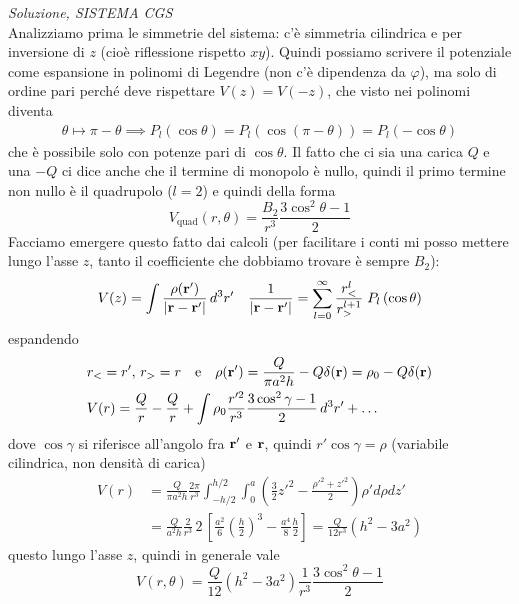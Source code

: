 \textit{Soluzione, SISTEMA CGS}\\
Analizziamo prima le simmetrie del sistema: c'è simmetria cilindrica e per inversione di $ z $ (cioè riflessione rispetto $ xy $). Quindi possiamo 
scrivere il potenziale come espansione in polinomi di Legendre (non c'è dipendenza da $ \varphi $), ma solo di ordine pari perché deve rispettare 
$ V(z) = V(-z) $, che visto nei polinomi diventa
\begin{align}
  \theta \mapsto \pi - \theta \implies P_l(\cos\theta) = P_l(\cos(\pi-\theta)) = P_l (-\cos\theta) 
\end{align}
che è possibile solo con potenze pari di $ \cos\theta $. Il fatto che ci sia una carica $ Q $ e una $ -Q $ ci dice anche che il termine di monopolo è 
nullo, quindi il primo termine non nullo è il quadrupolo ($ l=2 $) e quindi della forma
\begin{equation}
  V_{\text{quad}}(r, \theta) = \frac{B_2}{r^3} \frac{3\cos^2\theta - 1}{2}
\end{equation}
Facciamo emergere questo fatto dai calcoli (per facilitare i conti mi posso mettere lungo l'asse $ z $, tanto il coefficiente che dobbiamo trovare è
sempre $ B_2 $):
\begin{align}
  V(z) = \int \frac{\rho(\mathbf{ r }')}{\mathbf{ |r-r'| } } \,d^3r' && \frac{1}{\mathbf{ |r-r'| }} = \sum_{l=0}^{\infty} \frac{r_{<}^{l}}{r_{>}^{l+1}} \; P_l \left( \cos \theta \right)
\end{align}
espandendo
\begin{align}
  &r_< = r' , \, r_> = r \quad \text{e} \quad \rho(\mathbf{ r' }) = \frac{Q}{\pi a^2 h} -Q \delta (\mathbf{ r }) = \rho_0 - Q \delta(\mathbf{ r })
  \\
  &V(r) = \frac{Q}{r} - \frac{Q}{r} + \int \rho_0 \frac{r'^2}{r^3} \frac{3\cos^2\gamma - 1}{2} \,d^3r' + \dots
\end{align}
dove $ \cos\gamma $ si riferisce all'angolo fra $ \mathbf{ r }' $ e $ \mathbf{ r } $, quindi $ r' \cos \gamma = \rho $ (variabile cilindrica, non densità 
di carica)
\begin{align}
  V(r) &= \frac{Q}{\pi a^2 h} \frac{2\pi}{r^3} \int_{-h/2}^{h/2} \int_{0}^{a}  \left( \frac{3}{2} z'^2 - \frac{\rho'^2 + z'^2}{2} \right) \rho' d\rho dz'
  \\
  &= \frac{Q}{a^2 h} \frac{2}{r^3}\, 2 \,\left[ \frac{a^2}{6} \left( \frac{h}{2} \right)^3 - \frac{a^4}{8} \frac{h}{2} \right] = \frac{Q}{12 r^3} \left( h^2 - 3a^2 \right)
\end{align}
questo lungo l'asse $ z $, quindi in generale vale
\begin{equation}
  V(r,\theta) = \frac{Q}{12} \left( h^2 - 3a^2 \right) \frac{1}{r^3} \frac{3\cos^2\theta - 1}{2}
\end{equation}


